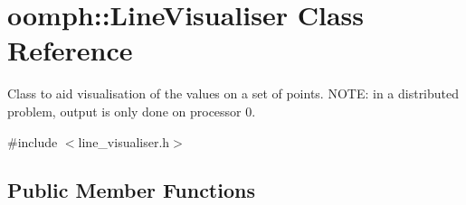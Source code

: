 \hypertarget{classoomph_1_1LineVisualiser}{}\section{oomph\+:\+:Line\+Visualiser Class Reference}
\label{classoomph_1_1LineVisualiser}


Class to aid visualisation of the values on a set of points. N\+O\+TE\+: in a distributed problem, output is only done on processor 0.  




{\ttfamily \#include $<$line\+\_\+visualiser.\+h$>$}

\subsection*{Public Member Functions}
